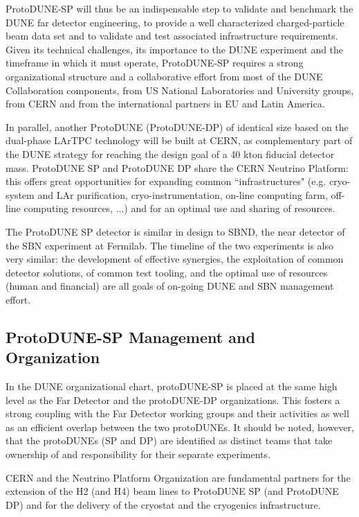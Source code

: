 \documentclass[11pt, oneside]{article}   	%
\begin{document}
ProtoDUNE-SP will thus be an indispensable step to validate and benchmark the DUNE far detector engineering, to provide a well characterized charged-particle beam data set and to validate and test associated infrastructure requirements. 
Given its technical challenges, its importance to the DUNE experiment and the timeframe in which it must operate, ProtoDUNE-SP requires a strong organizational structure and a collaborative effort from most of the DUNE Collaboration components,  
from US National Laboratories and University groups, from CERN and from the international partners in EU and Latin America. 

In parallel, another ProtoDUNE (ProtoDUNE-DP) of identical size based on the dual-phase LArTPC technology will be built at CERN, as complementary part of the DUNE strategy for reaching the design goal of a 40 kton fiducial detector mass.
ProtoDUNE SP and ProtoDUNE DP share the CERN Neutrino Platform: this offers great opportunities for expanding common ``infrastructures" (e.g. cryo-system and LAr purification, cryo-instrumentation, on-line computing farm, off-line computing resources, ...) and for an optimal use and sharing of resources.

The ProtoDUNE SP detector is similar in design to SBND, the near detector of the SBN experiment at Fermilab. The timeline of the two experiments is also very similar: the development of effective synergies, the exploitation of common detector solutions, of common test tooling, and the optimal use of resources (human and financial) are all goals of on-going DUNE and SBN management effort. 

\subsection{ProtoDUNE-SP Management and Organization}
In the DUNE organizational chart, protoDUNE-SP is placed at the same high level as the Far Detector and the protoDUNE-DP organizations. This fosters a strong coupling with the Far Detector working groups and their activities as well as an efficient 
 overlap between the two protoDUNEs. It should be noted, however, that the protoDUNEs (SP and DP) are identified as distinct teams that take ownership of and responsibility for their separate experiments.
 
CERN and the Neutrino Platform Organization are fundamental partners for the 
 extension of the H2 (and H4) beam lines to ProtoDUNE SP (and ProtoDUNE DP) and for the delivery of the cryostat and the cryogenics infrastructure.
\end{document}

